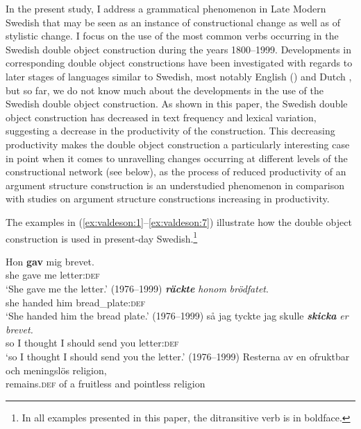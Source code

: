 \documentclass[output=paper]{langscibook}
\begin{document}
In the present study, I address a grammatical phenomenon in Late Modern Swedish that may be seen as an instance of constructional change as well as of stylistic change. I focus on the use of the most common verbs occurring in the Swedish double object construction during the years 1800–1999. Developments in corresponding double object constructions have been investigated with regards to later stages of languages similar to Swedish, most notably English (\citealt{CollemanDe_Clerck2008,  CollemanDe_Clerck2011, CollemanDe_Clerck2008}) and Dutch \citep{Colleman2011}, but so far, we do not know much about the developments in the use of the Swedish double object construction. As shown in this paper, the Swedish double object construction has decreased in text frequency and lexical variation, suggesting a decrease in the productivity of the construction. This decreasing productivity makes the double object construction a particularly interesting case in point when it comes to unravelling changes occurring at different levels of the constructional network (see  below), as the process of reduced productivity of an argument structure construction is an understudied phenomenon in comparison with studies on argument structure constructions increasing in productivity.



The examples in (\ref{ex:valdeson:1}--\ref{ex:valdeson:7}) illustrate how the double object construction is used in present-day Swedish.\footnote{In all examples presented in this paper, the ditransitive verb is in boldface.}


\ea \label{ex:valdeson:1}
\gll Hon \textbf{gav} mig     brevet.\\
she    gave     me   letter:\textsc{def}\\
\glt `She gave me the letter.’ (1976--1999)
\ex
{} \textbf{\textit{räckte}} \textit{honom}     \textit{brödfatet}.\\
  she       handed     him       bread\_plate:\textsc{def}  \\
\glt `She handed him the bread plate.’ (1976--1999)
\ex
\gll så     jag   tyckte   jag     skulle \textbf{\textit{skicka}} \textit{er}       \textit{brevet.}\\
  so    I        thought  I      should    send    you    letter:\textsc{def}\\
\glt `so I thought I should send you the letter.’ (1976--1999)
\ex
\gll Resterna av   en ofruktbar     och   meningslös religion,\\
  remains.\textsc{def} of  a  fruitless  and  pointless  religion    \\
\end{document}
